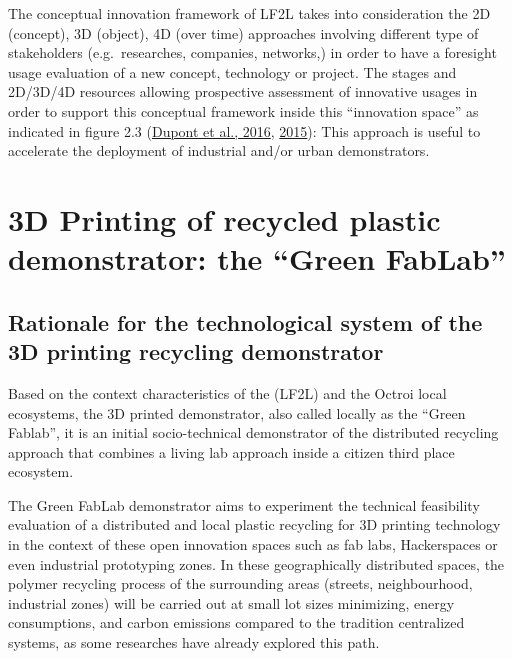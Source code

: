 \documentclass[
  11pt,
]{article}
\begin{document}
The conceptual innovation framework of LF2L takes into consideration the
2D (concept), 3D (object), 4D (over time) approaches involving different
type of stakeholders (e.g.~researches, companies, networks,) in order to
have a foresight usage evaluation of a new concept, technology or
project. The stages and 2D/3D/4D resources allowing prospective
assessment of innovative usages in order to support this conceptual
framework inside this ``innovation space'' as indicated in figure 2.3
(\protect\hyperlink{ref-Dupont2016}{Dupont et al., 2016},
\protect\hyperlink{ref-Dupont2015b}{2015}): This approach is useful to
accelerate the deployment of industrial and/or urban demonstrators.

\hypertarget{d-printing-of-recycled-plastic-demonstrator-the-green-fablab}{%
\section{3D Printing of recycled plastic demonstrator: the ``Green
FabLab''}\label{d-printing-of-recycled-plastic-demonstrator-the-green-fablab}}

\hypertarget{rationale-for-the-technological-system-of-the-3d-printing-recycling-demonstrator}{%
\subsection{Rationale for the technological system of the 3D printing
recycling
demonstrator}\label{rationale-for-the-technological-system-of-the-3d-printing-recycling-demonstrator}}

Based on the context characteristics of the (LF2L\textregistered) and
the Octroi local ecosystems, the 3D printed demonstrator, also called
locally as the ``Green Fablab'', it is an initial socio-technical
demonstrator of the distributed recycling approach that combines a
living lab approach inside a citizen third place ecosystem.

The Green FabLab demonstrator aims to experiment the technical
feasibility evaluation of a distributed and local plastic recycling for
3D printing technology in the context of these open innovation spaces
such as fab labs, Hackerspaces or even industrial prototyping zones. In
these geographically distributed spaces, the polymer recycling process
of the surrounding areas (streets, neighbourhood, industrial zones) will
be carried out at small lot sizes minimizing, energy consumptions, and
carbon emissions compared to the tradition centralized systems, as some
researches have already explored this path.
\end{document}

